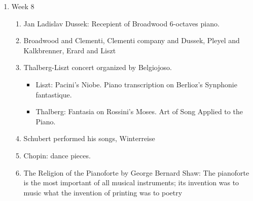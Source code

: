 \documentclass[math,code]{amznotes}
\theoremstyle{remark}
\begin{document}
\begin{enumerate}
\begin{enumerate}
        \item Etudes (Finger exercises): Czerny, Cramer, Clementi, Chopin, Hummel, Pischna, Brahms, etc.
        \item Hanon: The Virtuoso Pianist.
        \item D.G. Turk's Klavierschule: Suggested amateur to practice a handful of hours per week.
        \item Hunter: Instructions for the pianoforte.
        \item Herz: Complete method of piano.
        \item Frederich Wieck: Recommended quarter of an hour daily of scales.
        \item R.Schumann: Used a finger-strengthening device that ruined his hands. Album for the Young.
        \begin{itemize}
            \item Spring Song
            \item Gathering of Grapes-Happy Time
            \item Haverst Song
            \item Wintertime
        \end{itemize}
        \item Theodor Leschetizky: Beethoven $\rightarrow$ Czerny $\rightarrow$ Liszt, Leschetizky
    \end{enumerate}
    \item Week 8
    \begin{enumerate}
        \item Jan Ladislav Dussek: Recepient of Broadwood 6-octaves piano.
        \item Broadwood and Clementi, Clementi company and Dussek, Pleyel and Kalkbrenner, Erard and Liszt
        \item Thalberg-Liszt concert organized by Belgiojoso.
        \begin{itemize}
            \item Liszt: Pacini's Niobe. Piano transcription on Berlioz's Synphonie fantastique.
            \item Thalberg: Fantasia on Rossini's Moses. Art of Song Applied to the Piano.
        \end{itemize}
        \item Schubert performed his songs, Winterreise
        \item Chopin: dance pieces.
        \item The Religion of the Pianoforte by George Bernard Shaw: The pianoforte is the most important of all musical instruments; its invention was to music what the invention of printing was to poetry

\end{enumerate}
\end{enumerate}
\end{document}
